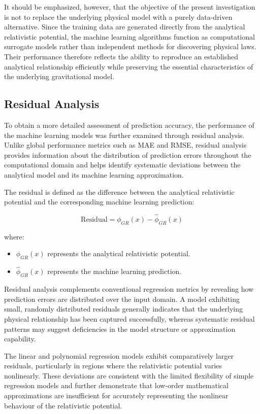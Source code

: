\documentclass[
]{article}
\providecommand{\tightlist}{
  \setlength{\itemsep}{0pt}\setlength{\parskip}{0pt}}
\begin{document}
It should be emphasized, however, that the objective of the present investigation is not to replace the underlying physical model with a purely data-driven alternative. Since the training data are generated directly from the analytical relativistic potential, the machine learning algorithms function as computational surrogate models rather than independent methods for discovering physical laws. Their performance therefore reflects the ability to reproduce an established analytical relationship efficiently while preserving the essential characteristics of the underlying gravitational model.

\subsection{Residual Analysis}\label{residual-analysis}

To obtain a more detailed assessment of prediction accuracy, the performance of the machine learning models was further examined through residual analysis. Unlike global performance metrics such as MAE and RMSE, residual analysis provides information about the distribution of prediction errors throughout the computational domain and helps identify systematic deviations between the analytical model and its machine learning approximation.

The residual is defined as the difference between the analytical relativistic potential and the corresponding machine learning prediction:

\[
\mathrm{Residual}=\phi_{GR}(x)-\hat{\phi}_{GR}(x)
\]

where:

\begin{itemize}
\tightlist
\item
$\phi_{GR}(x)$ represents the analytical relativistic potential.
\item
$\hat{\phi}_{GR}(x)$ represents the machine learning prediction.
\end{itemize}

Residual analysis complements conventional regression metrics by revealing how prediction errors are distributed over the input domain. A model exhibiting small, randomly distributed residuals generally indicates that the underlying physical relationship has been captured successfully, whereas systematic residual patterns may suggest deficiencies in the model structure or approximation capability.

The linear and polynomial regression models exhibit comparatively larger residuals, particularly in regions where the relativistic potential varies nonlinearly. These deviations are consistent with the limited flexibility of simple regression models and further demonstrate that low-order mathematical approximations are insufficient for accurately representing the nonlinear behaviour of the relativistic potential.
\end{document}
